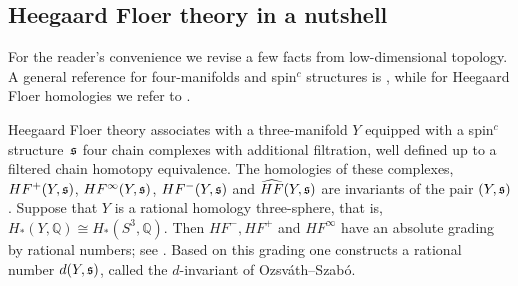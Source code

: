 \documentclass[11pt]{amsart}
\numberwithin{equation}{section}
\theoremstyle{plain}
\theoremstyle{definition}
\begin{document}
\subsection{Heegaard Floer theory in a nutshell}\label{sec:topnut}
For the reader's convenience we revise a few facts from low-dimensional topology. A general reference for four-manifolds and {spin$^c$}{} structures
is \cite{GS}, while for Heegaard Floer homologies we refer to \cite{OS-introduction,OS-introduction2}.

Heegaard Floer theory associates with a three-manifold $Y$ equipped with a {spin$^c$}{} structure~${\ifmmode{{\mathfrak s}}\else{${\mathfrak s}$\ }\fi}$ four chain complexes
with additional filtration, well defined up to a filtered chain homotopy equivalence. The homologies of these complexes, $HF^+(Y,{\ifmmode{{\mathfrak s}}\else{${\mathfrak s}$\ }\fi})$,
$HF^\infty(Y,{\ifmmode{{\mathfrak s}}\else{${\mathfrak s}$\ }\fi})$, $HF^-(Y,{\ifmmode{{\mathfrak s}}\else{${\mathfrak s}$\ }\fi})$ and $\widehat{HF}(Y,{\ifmmode{{\mathfrak s}}\else{${\mathfrak s}$\ }\fi})$ are invariants of the pair $(Y,{\ifmmode{{\mathfrak s}}\else{${\mathfrak s}$\ }\fi})$. 
Suppose that $Y$ is a rational homology three-sphere, that is,
$H_*(Y,{\mathbb Q})\cong H_*(S^3,{\mathbb Q})$. Then $HF^-,HF^+$ and $HF^\infty$ have an absolute grading by rational numbers; see \cite{OS-absolute}.
Based on this grading one constructs a rational number $d(Y,{\ifmmode{{\mathfrak s}}\else{${\mathfrak s}$\ }\fi})$, called the $d$-invariant of Ozsv\'ath--Szab\'o.
\end{document}
